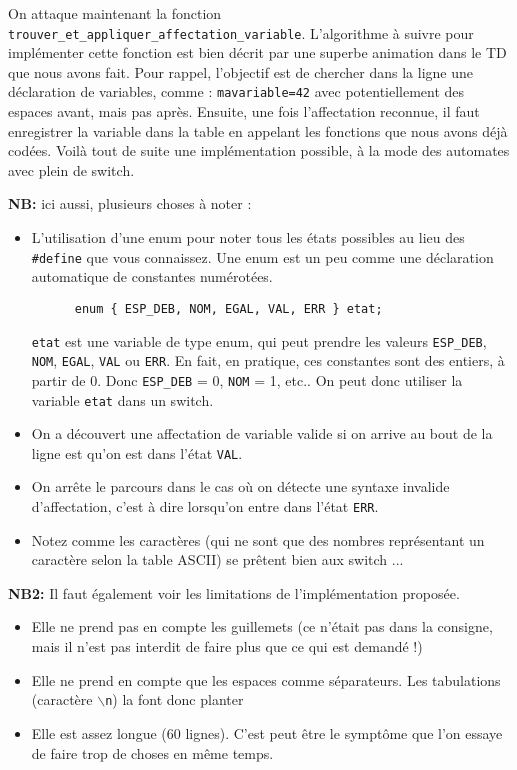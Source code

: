 \documentclass[10pt]{article}
\begin{document}
\begin{enumerate}[label=\textbf{[\alph*]}]
\item On attaque maintenant la fonction
  \texttt{trouver\_et\_appliquer\_affectation\_variable}. L'algorithme à
  suivre pour implémenter cette fonction est bien décrit par une
  superbe animation dans le TD que nous avons fait. Pour rappel,
  l'objectif est de chercher dans la ligne une déclaration de
  variables, comme : \texttt{mavariable=42} avec potentiellement des
  espaces avant, mais pas après. Ensuite, une fois l'affectation
  reconnue, il faut enregistrer la variable dans la table en appelant
  les fonctions que nous avons déjà codées. Voilà tout de suite une
  implémentation possible, à la mode des automates avec plein de switch.

  

  \vspace{0.2cm}
  \textbf{NB:} ici aussi, plusieurs choses à noter :
  \begin{itemize}
  \item L'utilisation d'une enum pour noter tous les états possibles
    au lieu des \texttt{\#define} que vous connaissez. Une enum est un
    peu comme une déclaration automatique de constantes
    numérotées.

    \begin{lstlisting}
      enum { ESP_DEB, NOM, EGAL, VAL, ERR } etat;
    \end{lstlisting}

    \texttt{etat} est une variable de type enum, qui peut
    prendre les valeurs \texttt{ESP\_DEB}, \texttt{NOM},
    \texttt{EGAL}, \texttt{VAL} ou \texttt{ERR}. En fait, en
    pratique, ces constantes sont des entiers, à partir de 0. Donc
    \texttt{ESP\_DEB} = 0, \texttt{NOM} = 1, etc.. On peut donc
    utiliser la variable \texttt{etat} dans un switch.
  \item On a découvert une affectation de variable valide si on
    arrive au bout de la ligne est qu'on est dans l'état
    \texttt{VAL}.
  \item On arrête le parcours dans le cas où on détecte une syntaxe
    invalide d'affectation, c'est à dire lorsqu'on entre dans l'état
    \texttt{ERR}.
  \item Notez comme les caractères (qui ne sont que des nombres
    représentant un caractère selon la table ASCII) se prêtent bien
    aux switch ...
  \end{itemize}

  \textbf{NB2: } Il faut également voir les limitations de
  l'implémentation proposée.
  \begin{itemize}
  \item Elle ne prend pas en compte les guillemets (ce n'était pas
    dans la consigne, mais il n'est pas interdit de faire plus que ce
    qui est demandé !)
  \item Elle ne prend en compte que les espaces comme séparateurs. Les
    tabulations (caractère \texttt{$\backslash$n}) la font donc
    planter
  \item Elle est assez longue (60 lignes). C'est peut être le symptôme
    que l'on essaye de faire trop de choses en même temps.
  \end{itemize}


\end{enumerate}
\end{document}
